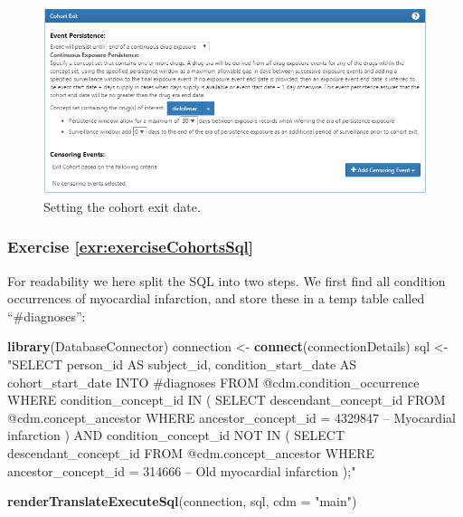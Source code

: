 \documentclass[11pt]{book}
\newenvironment{Shaded}{\begin{snugshade}}{\end{snugshade}}
\newcommand{\DataTypeTok}[1]{\textcolor[rgb]{0.13,0.29,0.53}{#1}}
\newcommand{\KeywordTok}[1]{\textcolor[rgb]{0.13,0.29,0.53}{\textbf{#1}}}
\newcommand{\NormalTok}[1]{#1}
\newcommand{\StringTok}[1]{\textcolor[rgb]{0.31,0.60,0.02}{#1}}
\theoremstyle{definition}
\theoremstyle{definition}
\theoremstyle{definition}
\theoremstyle{remark}
\begin{document}
\begin{figure}

{\centering \includegraphics[width=1\linewidth]{images/SuggestedAnswers/cohortsAtlasExit} 

}

\caption{Setting the cohort exit date.}\label{fig:cohortsAtlasExit}
\end{figure}

\hypertarget{exercise-refexrexercisecohortssql}{%
\subsubsection*{Exercise \ref{exr:exerciseCohortsSql}}\label{exercise-refexrexercisecohortssql}}

For readability we here split the SQL into two steps. We first find all condition occurrences of myocardial infarction, and store these in a temp table called ``\#diagnoses'':

\begin{Shaded}
\begin{Highlighting}[]
\KeywordTok{library}\NormalTok{(DatabaseConnector)}
\NormalTok{connection <-}\StringTok{ }\KeywordTok{connect}\NormalTok{(connectionDetails)}
\NormalTok{sql <-}\StringTok{ "SELECT person_id AS subject_id,}
\StringTok{  condition_start_date AS cohort_start_date}
\StringTok{INTO #diagnoses}
\StringTok{FROM @cdm.condition_occurrence}
\StringTok{WHERE condition_concept_id IN (}
\StringTok{    SELECT descendant_concept_id}
\StringTok{    FROM @cdm.concept_ancestor}
\StringTok{    WHERE ancestor_concept_id = 4329847 -- Myocardial infarction}
\StringTok{)}
\StringTok{  AND condition_concept_id NOT IN (}
\StringTok{    SELECT descendant_concept_id}
\StringTok{    FROM @cdm.concept_ancestor}
\StringTok{    WHERE ancestor_concept_id = 314666 -- Old myocardial infarction}
\StringTok{);"}

\KeywordTok{renderTranslateExecuteSql}\NormalTok{(connection, sql, }\DataTypeTok{cdm =} \StringTok{"main"}\NormalTok{)}
\end{Highlighting}
\end{Shaded}
\end{document}
